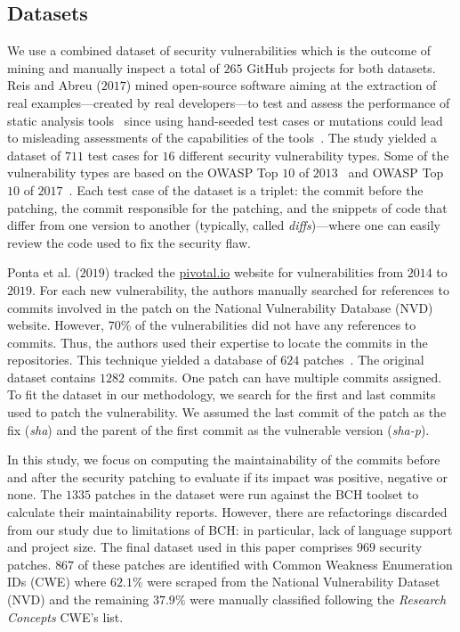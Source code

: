 \documentclass[smallextended]{svjour3}       %
\begin{document}
\subsection{Datasets}
%

We use a combined dataset of security vulnerabilities which is 
the outcome of mining and manually inspect a total of $265$ GitHub projects for both
datasets. Reis and Abreu 
($2017$) mined open-source
software aiming at the extraction of real examples---created by real
developers---to test and assess the performance of static analysis tools~\cite{Reis:2017:IJSSE} since
using hand-seeded test cases or mutations could lead to misleading assessments
of the capabilities of the tools~\cite{just2014mutants}. The study yielded a
dataset of $711$ test cases for $16$ different security vulnerability types. Some of the vulnerability types
are based on the OWASP Top $10$ of $2013$~\cite{oswap:2013} and OWASP Top $10$ of
$2017$~\cite{oswap:2017}. Each test case of the
dataset is a triplet: the commit before the patching, the commit responsible
for the patching, and the snippets of code that differ from one version to
another (typically, called \textit{diffs})---where one can easily review the
code used to fix the security flaw. 
%

Ponta et al. ($2019$) tracked the \url{pivotal.io} website for vulnerabilities 
from $2014$ to $2019$. For each new vulnerability, the authors manually searched 
for references to commits involved in the patch on the National Vulnerability 
Database (NVD) website. However, $70\%$
of the vulnerabilities did not have any references to commits. Thus, the authors
used their expertise to locate the commits in the repositories. This technique 
yielded a database of $624$ patches~\cite{10.1109/MSR.2019.00064}. The original 
dataset contains $1282$ commits. One patch can have multiple commits assigned.
To fit the dataset in our methodology, we search for the first and last commits
used to patch the vulnerability. We assumed the last commit of the patch as 
the fix (\emph{sha}) and the parent of the first commit as the vulnerable version 
(\emph{sha-p}).
%

In this study, we focus on computing the
maintainability of the commits before and after the security patching to
evaluate if its impact was positive, negative or none.
The $1335$ patches in the dataset were run against the BCH toolset to
calculate their maintainability reports. However, there are refactorings
discarded from our study due to limitations of BCH: in particular, lack of
language support and project size. The final dataset used in this paper comprises
$969$ security patches. $867$ of these patches are identified with Common Weakness
Enumeration IDs (CWE) where $62.1\%$ were scraped from the National Vulnerability 
Dataset (NVD) and the remaining $37.9\%$ were manually classified following the 
\emph{Research Concepts} CWE's list.
\end{document}
